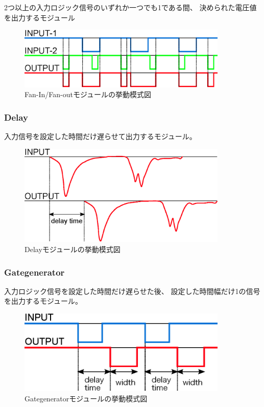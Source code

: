 \documentclass{jarticle}
\begin{document}
	  2つ以上の入力ロジック信号のいずれか一つでも1である間、
	  決められた電圧値を出力するモジュール
	  
	  \begin{figure}[H]
	   \begin{center}
	    \includegraphics[width = 100mm]{./picture/FaninFanout.eps}
	   \end{center}
	   \caption{Fan-In/Fan-outモジュールの挙動模式図}
	   \label{Fig:FaninFanout}
	  \end{figure}
	  
   \subsubsection*{Delay}
    	  
    	  入力信号を設定した時間だけ遅らせて出力するモジュール。
    	  
	  \begin{figure}[H]
	   \begin{center}
	    \includegraphics[width = 100mm]{./picture/Delay.eps}
	   \end{center}
	   \caption{Delayモジュールの挙動模式図}
	   \label{Fig:Delay}
	  \end{figure}
	  
	  
   \subsubsection*{Gategenerator}
   	  
	  入力ロジック信号を設定した時間だけ遅らせた後、
	  設定した時間幅だけ1の信号を出力するモジュール。
	  
	  \begin{figure}[H]
	   \begin{center}
	    \includegraphics[width = 100mm]{./picture/Gategenerator.eps}
	   \end{center}
	   \caption{Gategeneratorモジュールの挙動模式図}
	   \label{Fig:Gategenerator}
	  \end{figure}
	  
\end{document}
